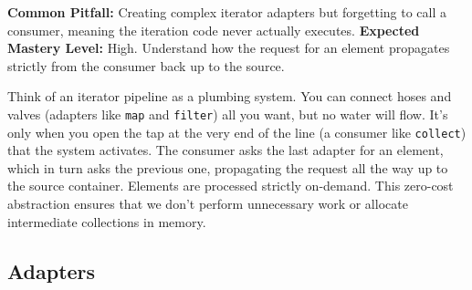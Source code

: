 \begin{examprioritybox}
\textbf{Common Pitfall:} Creating complex iterator adapters but forgetting to call a consumer, meaning the iteration code never actually executes.
\textbf{Expected Mastery Level:} High. Understand how the request for an element propagates strictly from the consumer back up to the source.

Think of an iterator pipeline as a plumbing system. You can connect hoses and valves (adapters like \texttt{map} and \texttt{filter}) all you want, but no water will flow. It's only when you open the tap at the very end of the line (a consumer like \texttt{collect}) that the system activates. The consumer asks the last adapter for an element, which in turn asks the previous one, propagating the request all the way up to the source container. Elements are processed strictly on-demand. This zero-cost abstraction ensures that we don't perform unnecessary work or allocate intermediate collections in memory.
\end{examprioritybox}

\subsection{Adapters}

